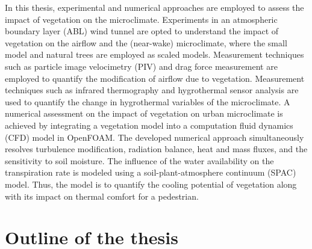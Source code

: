 In this thesis, experimental and numerical approaches are employed to assess the impact of vegetation on the microclimate. Experiments in an atmospheric boundary layer (ABL) wind tunnel are opted to understand the impact of vegetation on the airflow and the (near-wake) microclimate, where the small model and natural trees are employed as scaled models. Measurement techniques such as particle image velocimetry (PIV) and drag force measurement are employed to quantify the modification of airflow due to vegetation. Measurement techniques such as infrared thermography and hygrothermal sensor analysis are used to quantify the change in hygrothermal variables of the microclimate. A numerical assessment on the impact of vegetation on urban microclimate is achieved by integrating a vegetation model into a computation fluid dynamics (CFD) model in OpenFOAM. The developed numerical approach simultaneously resolves turbulence modification, radiation balance, heat and mass fluxes, and the sensitivity to soil moisture. The influence of the water availability on the transpiration rate is modeled using a soil-plant-atmosphere continuum (SPAC) model.  Thus, the model is to quantify the cooling potential of vegetation along with its impact on thermal comfort for a pedestrian.

\section{Outline of the thesis}

